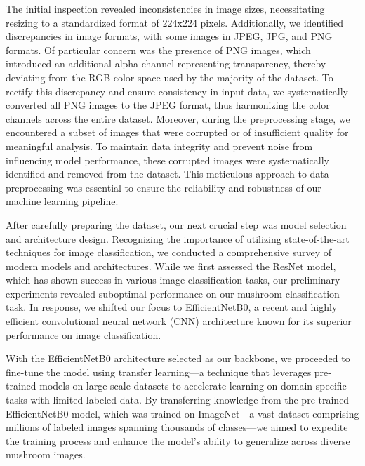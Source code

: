 The initial inspection revealed inconsistencies in image sizes, necessitating resizing to a standardized format of 224x224 pixels. Additionally, we identified discrepancies in image formats, with some images in JPEG, JPG, and PNG formats. Of particular concern was the presence of PNG images, which introduced an additional alpha channel representing transparency, thereby deviating from the RGB color space used by the majority of the dataset. To rectify this discrepancy and ensure consistency in input data, we systematically converted all PNG images to the JPEG format, thus harmonizing the color channels across the entire dataset. Moreover, during the preprocessing stage, we encountered a subset of images that were corrupted or of insufficient quality for meaningful analysis. To maintain data integrity and prevent noise from influencing model performance, these corrupted images were systematically identified and removed from the dataset. This meticulous approach to data preprocessing was essential to ensure the reliability and robustness of our machine learning pipeline.

After carefully preparing the dataset, our next crucial step was model selection and architecture design. Recognizing the importance of utilizing state-of-the-art techniques for image classification, we conducted a comprehensive survey of modern models and architectures. While we first assessed the ResNet model, which has shown success in various image classification tasks, our preliminary experiments revealed suboptimal performance on our mushroom classification task. In response, we shifted our focus to EfficientNetB0, a recent and highly efficient convolutional neural network (CNN) architecture known for its superior performance on image classification.


With the EfficientNetB0 architecture selected as our backbone, we proceeded to fine-tune the model using transfer learning—a technique that leverages pre-trained models on large-scale datasets to accelerate learning on domain-specific tasks with limited labeled data. By transferring knowledge from the pre-trained EfficientNetB0 model, which was trained on ImageNet—a vast dataset comprising millions of labeled images spanning thousands of classes—we aimed to expedite the training process and enhance the model's ability to generalize across diverse mushroom images.
